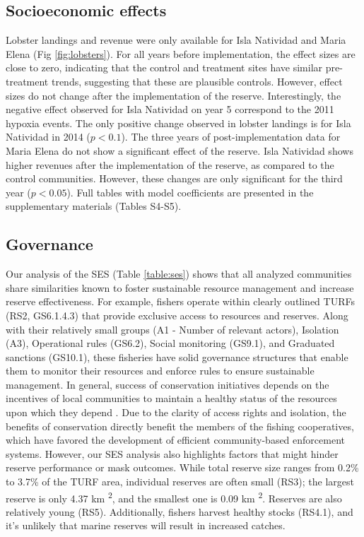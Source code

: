 \documentclass{frontiersSCNS}
\begin{document}
\hypertarget{socioeconomic-effects}{%
\subsection{Socioeconomic effects}\label{socioeconomic-effects}}

Lobster landings and revenue were only available for Isla Natividad and
Maria Elena (Fig \ref{fig:lobsters}). For all years before
implementation, the effect sizes are close to zero, indicating that the
control and treatment sites have similar pre-treatment trends,
suggesting that these are plausible controls. However, effect sizes do
not change after the implementation of the reserve. Interestingly, the
negative effect observed for Isla Natividad on year 5 correspond to the
2011 hypoxia events. The only positive change observed in lobster
landings is for Isla Natividad in 2014 (\(p < 0.1\)). The three years of
post-implementation data for Maria Elena do not show a significant
effect of the reserve. Isla Natividad shows higher revenues after the
implementation of the reserve, as compared to the control communities.
However, these changes are only significant for the third year
(\(p < 0.05\)). Full tables with model coefficients are presented in the
supplementary materials (Tables S4-S5).

\hypertarget{governance}{%
\subsection{Governance}\label{governance}}

Our analysis of the SES (Table \ref{table:ses}) shows that all analyzed
communities share similarities known to foster sustainable resource
management and increase reserve effectiveness. For example, fishers
operate within clearly outlined TURFs (RS2, GS6.1.4.3) that provide
exclusive access to resources and reserves. Along with their relatively
small groups (A1 - Number of relevant actors), Isolation (A3),
Operational rules (GS6.2), Social monitoring (GS9.1), and Graduated
sanctions (GS10.1), these fisheries have solid governance structures
that enable them to monitor their resources and enforce rules to ensure
sustainable management. In general, success of conservation initiatives
depends on the incentives of local communities to maintain a healthy
status of the resources upon which they depend \citep{jupiter_2017}. Due
to the clarity of access rights and isolation, the benefits of
conservation directly benefit the members of the fishing cooperatives,
which have favored the development of efficient community-based
enforcement systems. However, our SES analysis also highlights factors
that might hinder reserve performance or mask outcomes. While total
reserve size ranges from 0.2\% to 3.7\% of the TURF area, individual
reserves are often small (RS3); the largest reserve is only 4.37 km
\textsuperscript{2}, and the smallest one is 0.09 km
\textsuperscript{2}. Reserves are also relatively young (RS5).
Additionally, fishers harvest healthy stocks (RS4.1), and it's unlikely
that marine reserves will result in increased catches.
\end{document}
